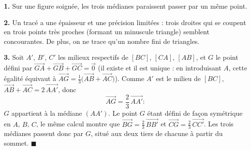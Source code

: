 \textbf{1.} Sur une figure soignée, les trois médianes paraissent passer par
un même point.

\textbf{2.} Un tracé a une épaisseur et une précision limitées : trois droites
qui se coupent en trois points très proches (formant un minuscule triangle)
semblent concourantes. De plus, on ne trace qu'un nombre fini de triangles.

\textbf{3.} Soit $A'$, $B'$, $C'$ les milieux respectifs de $[BC]$, $[CA]$,
$[AB]$, et $G$ le point défini par
$\overrightarrow{GA} + \overrightarrow{GB} + \overrightarrow{GC} = \vec 0$
(il existe et il est unique : en introduisant $A$, cette égalité équivaut à
$\overrightarrow{AG} = \frac13\bigl(\overrightarrow{AB} + \overrightarrow{AC}\bigr)$).
Comme $A'$ est le milieu de $[BC]$,
$\overrightarrow{AB} + \overrightarrow{AC} = 2\,\overrightarrow{AA'}$, donc
\[
\overrightarrow{AG} = \frac23\,\overrightarrow{AA'} :
\]
$G$ appartient à la médiane $(AA')$. Le point $G$ étant défini de façon
symétrique en $A$, $B$, $C$, le même calcul montre que
$\overrightarrow{BG} = \frac23\,\overrightarrow{BB'}$ et
$\overrightarrow{CG} = \frac23\,\overrightarrow{CC'}$. Les trois médianes
passent donc par $G$, situé aux deux tiers de chacune à partir du sommet.
\hfill $\blacksquare$
